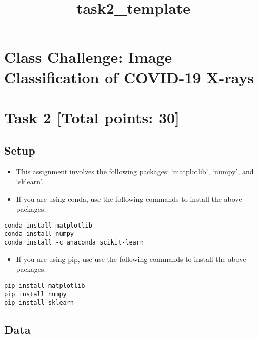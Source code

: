 \documentclass[11pt]{article}
\title{task2\_template}
\providecommand{\tightlist}{%
      \setlength{\itemsep}{0pt}\setlength{\parskip}{0pt}}
\begin{document}
    
    \maketitle
    
    

    
    \hypertarget{class-challenge-image-classification-of-covid-19-x-rays}{%
\section{Class Challenge: Image Classification of COVID-19
X-rays}\label{class-challenge-image-classification-of-covid-19-x-rays}}

\hypertarget{task-2-total-points-30}{%
\section{Task 2 {[}Total points: 30{]}}\label{task-2-total-points-30}}

    \hypertarget{setup}{%
\subsection{Setup}\label{setup}}

\begin{itemize}
\item
  This assignment involves the following packages: `matplotlib',
  `numpy', and `sklearn'.
\item
  If you are using conda, use the following commands to install the
  above packages:
\end{itemize}

\begin{verbatim}
conda install matplotlib
conda install numpy
conda install -c anaconda scikit-learn
\end{verbatim}

\begin{itemize}
\tightlist
\item
  If you are using pip, use use the following commands to install the
  above packages: 
\end{itemize}

\begin{verbatim}
pip install matplotlib
pip install numpy
pip install sklearn
\end{verbatim}

    \hypertarget{data}{%
\subsection{Data}\label{data}}
\end{document}
